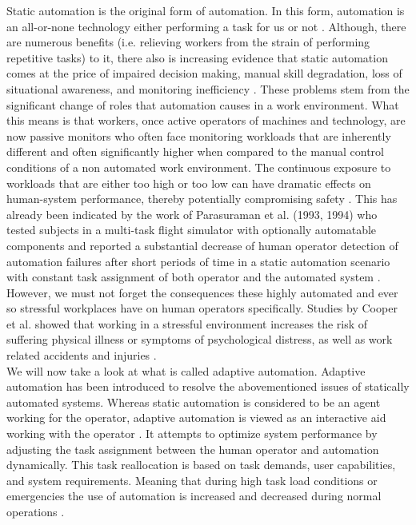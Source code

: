 Static automation is the original form of automation. In this form, automation is an all-or-none technology either performing a task for us or not \cite{Byrne2006}.
Although, there are numerous benefits (i.e. relieving workers from the strain of performing repetitive tasks) to it, there also is increasing evidence that static automation comes at the price of impaired decision making, manual skill degradation, loss of situational awareness, and monitoring inefficiency \cite{Byrne1996}.
These problems stem from the significant change of roles that automation causes in a work environment. What this means is that workers, once active operators of machines and technology, are now passive monitors who often face monitoring workloads that are inherently different and often significantly higher when compared to the manual control conditions of a non automated work environment. The continuous exposure to workloads that are either too high or too low can have dramatic effects on human-system performance, thereby potentially compromising safety \cite{Mehta2013}. This has already been indicated by the work of Parasuraman et al. (1993, 1994) who tested subjects in a multi-task flight simulator with optionally automatable components and reported a substantial decrease of human operator detection of automation failures after short periods of time in a static automation scenario with constant task assignment of both operator and the automated system \cite{Byrne1996}.
However, we must not forget the consequences these highly automated and ever so stressful workplaces have on human operators specifically. Studies by Cooper et al. showed that working in a stressful environment increases the risk of suffering physical illness or symptoms of psychological distress, as well as work related accidents and injuries \cite{Clarke2004}.\\
We will now take a look at what is called adaptive automation. Adaptive automation has been introduced to resolve the abovementioned issues of statically automated systems.
Whereas static automation is considered to be an agent working for the operator, adaptive automation is viewed as an interactive aid working with the operator \cite{Byrne1996}. It attempts to optimize system performance by adjusting the task assignment between the human operator and automation dynamically. This task reallocation is based on task demands, user capabilities, and system requirements. Meaning that during high task load conditions or emergencies the use of automation is increased and decreased during normal operations \cite{Mehta2013}.
